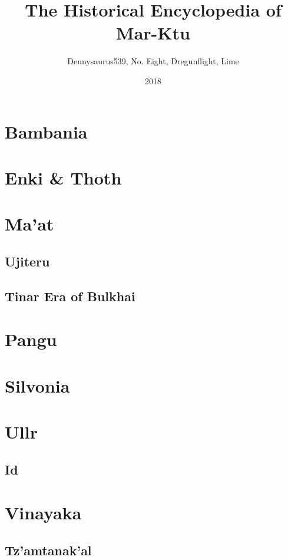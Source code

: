 \documentclass[ansiapaper, 11pt, openright, twoside]{book}
\title{The Historical Encyclopedia of Mar-Ktu}
\date{2018}
\author{Dennysaurus539, No. Eight, Dregunflight, Lime}
\begin{document}
	
	
	\chapter{Bambania}
		\begin{multicols}{2}
			
		\end{multicols}
	\chapter{Enki \& Thoth}
		\begin{multicols}{2}
			
		\end{multicols}
	\chapter{Ma'at}
		\begin{multicols}{2}
			\section{Ujiteru}
				
			\section{Tinar Era of Bulkhai}
				
		\end{multicols}
	\chapter{Pangu}
		\begin{multicols}{2}
			
		\end{multicols}
	\chapter{Silvonia}
		\begin{multicols}{2}
			
		\end{multicols}
	\chapter{Ullr}
		\begin{multicols}{2}
			\section{Id}
				
		\end{multicols}
	\chapter{Vinayaka} 
		\begin{multicols}{2}
			\section{Tz'amtanak'al}
				
		\end{multicols}
	\printindex
	
\end{document}
